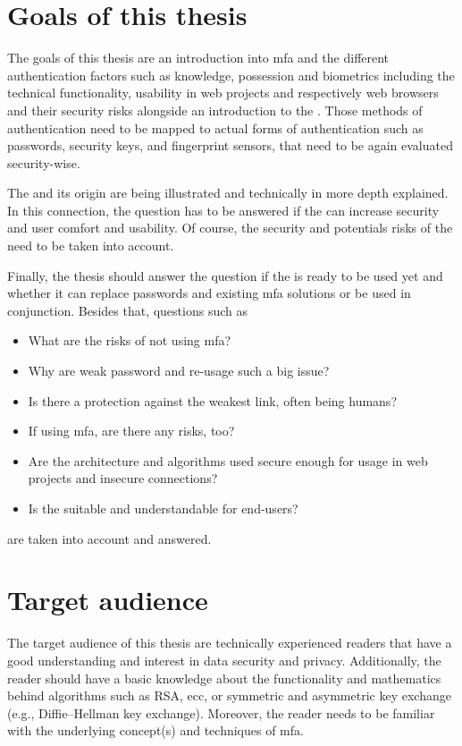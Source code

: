 \section{Goals of this thesis}

The goals of this thesis are an introduction into \gls{mfa} and the different authentication factors such as \frqq knowledge, possession and biometrics\flqq{} including the technical functionality, usability in web projects and respectively web browsers and their security risks alongside an introduction to the \wa. Those methods of authentication need to be mapped to actual forms of authentication such as passwords, security keys, and fingerprint sensors, that need to be again evaluated security-wise.

The \wa{} and its origin are being illustrated and technically in more depth explained. In this connection, the question has to be answered if the \wa{} can increase security and user comfort and usability. Of course, the security and potentials risks of the \wa{} need to be taken into account.

Finally, the thesis should answer the question if the \wa{} is ready to be used yet and whether it can replace passwords and existing \gls{mfa} solutions or be used in conjunction.
Besides that, questions such as

\begin{itemize}
	\item What are the risks of not using \gls{mfa}?
	\item Why are weak password and re-usage such a big issue?
	\item Is there a protection against the weakest link, often being humans?
	\item If using \gls{mfa}, are there any risks, too?
	\item Are the architecture and algorithms used secure enough for usage in web projects and insecure connections?
	\item Is the \wa{} suitable and understandable for end-users?
\end{itemize}

are taken into account and answered.

\section{Target audience}

The target audience of this thesis are technically experienced readers that have a good understanding and interest in data security and privacy. Additionally, the reader should have a basic knowledge about the functionality and mathematics behind algorithms such as RSA, \gls{ecc}, or symmetric and asymmetric key exchange (e.g., Diffie–Hellman key exchange). Moreover, the reader needs to be familiar with the underlying concept(s) and techniques of \gls{mfa}.

